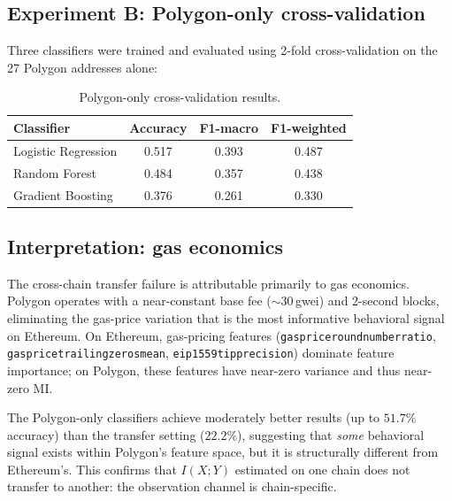 \documentclass[11pt,a4paper]{article}
\renewcommand{\_}{\oldunderscore\allowbreak}
\begin{document}
\subsection{Experiment B: Polygon-only cross-validation}

Three classifiers were trained and evaluated using 2-fold
cross-validation on the 27 Polygon addresses alone:

\begin{table}[h]
\centering
\caption{Polygon-only cross-validation results.}
\label{tab:polygon_cv}
\begin{tabular}{lccc}
\toprule
\textbf{Classifier} & \textbf{Accuracy} & \textbf{F1-macro} & \textbf{F1-weighted} \\
\midrule
Logistic Regression   & 0.517 & 0.393 & 0.487 \\
Random Forest         & 0.484 & 0.357 & 0.438 \\
Gradient Boosting     & 0.376 & 0.261 & 0.330 \\
\bottomrule
\end{tabular}
\end{table}

\subsection{Interpretation: gas economics}

The cross-chain transfer failure is attributable primarily to gas
economics. Polygon operates with a near-constant base fee
(${\sim}30$\,gwei) and 2-second blocks, eliminating the gas-price
variation that is the most informative behavioral signal on Ethereum.
On Ethereum, gas-pricing features (\texttt{gas\_price\_round\_number\_ratio},
\texttt{gas\_price\_trailing\_zeros\_mean},
\texttt{eip1559\_tip\_precision}) dominate feature importance; on
Polygon, these features have near-zero variance and thus near-zero MI.

The Polygon-only classifiers achieve moderately better results
(up to $51.7\%$ accuracy) than the transfer setting ($22.2\%$),
suggesting that \emph{some} behavioral signal exists within Polygon's
feature space, but it is structurally different from Ethereum's.
This confirms that $I(X;Y)$ estimated on one chain does not transfer
to another: the observation channel is chain-specific.

\end{document}
